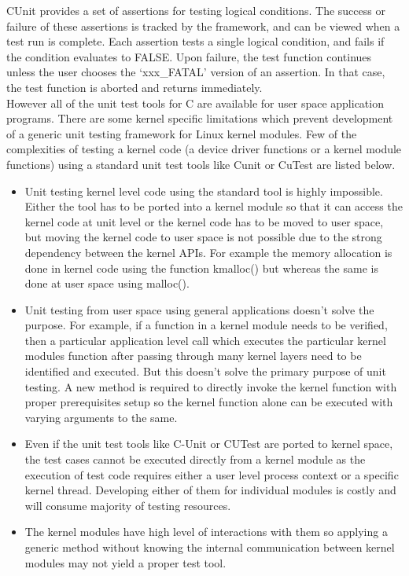 CUnit provides a set of assertions for testing logical conditions.  The success or failure of these assertions is tracked by the framework, and can be viewed when a test run is complete. Each assertion tests a single logical condition, and fails if the condition evaluates to FALSE. Upon failure, the test function continues unless the user chooses the `xxx\_FATAL'  version of an assertion. In that case, the test function is aborted and returns immediately.  \\

However all of the unit test tools for C are available for user space application programs. There are some kernel specific limitations which prevent development of a generic unit testing framework for Linux kernel modules.  Few of the complexities of testing a kernel code (a device driver functions or a kernel module functions)  using a standard unit test tools like Cunit or CuTest are listed below.\\
\begin{itemize}
\item Unit testing kernel level code using the standard tool is highly impossible. Either the tool has to be ported into a kernel module so that it can access the kernel code at unit level or the kernel code has to be moved to user space, but moving the kernel code to user space is not possible due to the strong dependency between the kernel APIs. For example the memory allocation is done in kernel code using the function kmalloc() but whereas the same is done at user space using malloc().\\

\item Unit testing from user space using general applications doesn’t solve the purpose.  For example, if a function in a kernel module needs to be verified, then a particular application level call which executes the particular kernel modules function after passing through many kernel layers need to be identified and executed. But this doesn’t solve the primary purpose of unit testing. A new method is required to directly invoke the kernel function with proper prerequisites setup so the kernel function alone can be executed with varying arguments to the same. 
\item  Even if the unit test tools like C-Unit or CUTest are ported to kernel space, the test cases cannot be executed directly from a kernel module as the execution of test code requires either a user level process context or a specific kernel thread.  Developing either of them for individual modules is costly and will consume majority of testing resources.
\item  The kernel modules have high level of interactions with them so applying a generic method without knowing the internal communication between kernel modules may not yield a proper test tool.

\end{itemize}


